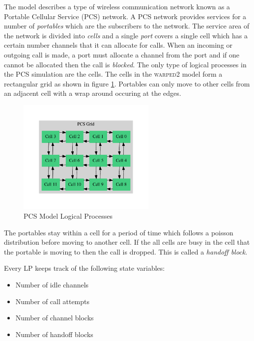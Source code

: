 \documentclass[11pt]{book}
\begin{document}
The model describes a type of wireless communication network known as a Portable Cellular
Service (PCS) network. A PCS network provides services for a number of \emph{portables} which
are the subscribers to the network. The service area of the network is divided into
\emph{cells} and a single \emph{port} covers a single cell which has a certain number channels that
it can allocate for calls. When an incoming or outgoing call is made, a port must allocate
a channel from the port and if one cannot be allocated then the call is \emph{blocked}\cite{lin-96b}.
The only type of logical processes in the PCS simulation are the cells. The cells in the
\textsc{warped2} model form a rectangular grid as shown in figure \ref{pcs_model_lps}.
Portables can only move to other cells from an adjacent cell with a wrap around occuring
at the edges.

\begin{figure}[H]
    \centering
    \includegraphics[width=0.6\textwidth,quiet]{figs/graphviz/pcs_model.pdf}
    \caption{PCS Model Logical Processes}\label{pcs_model_lps}
\end{figure}

The portables stay within a cell for a period of time which follows a poisson distribution
before moving to another cell. If the all cells are busy in the cell that the portable
is moving to then the call is dropped. This is called a \emph{handoff block}.

Every LP keeps track of the following state variables:
\begin{itemize}
    \item Number of idle channels
    \item Number of call attempts
    \item Number of channel blocks
    \item Number of handoff blocks
\end{itemize}
\end{document}
